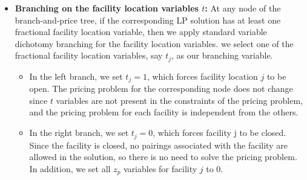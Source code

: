 \begin {itemize}
\item [{\bf Rule 1}]

{\bf Branching on the facility location variables $t$:} At any node of the branch-and-price tree, 
if the corresponding LP solution has at least one fractional facility location variable, then
we apply standard variable dichotomy branching for the facility location variables.
we select one of the fractional facility location variables, say $t_j$, as our branching
variable. 
\begin {itemize}
\item In the left branch, we set $t_j=1$, which forces facility location $j$ to be open. 
  The pricing problem for the corresponding node does not change since $t$ variables
  are not present in the constraints of the pricing problem, and the pricing problem for 
  each facility is independent from the others. 
\item In the right branch, we set $t_j=0$, which forces facility j to be closed. 
  Since the facility is closed, no pairings associated with the facility are allowed in the 
  solution, so there is no need to solve the pricing problem. In addition, we set all $z_{p}$ 
  variables for facility $j$ to 0.
\end{itemize}


\end{itemize}
